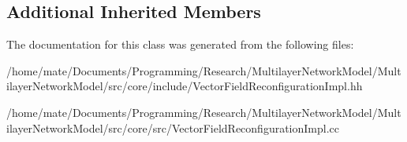 \subsection*{Additional Inherited Members}


The documentation for this class was generated from the following files\+:\begin{DoxyCompactItemize}
\item 
/home/mate/\+Documents/\+Programming/\+Research/\+Multilayer\+Network\+Model/\+Multilayer\+Network\+Model/src/core/include/Vector\+Field\+Reconfiguration\+Impl.\+hh\item 
/home/mate/\+Documents/\+Programming/\+Research/\+Multilayer\+Network\+Model/\+Multilayer\+Network\+Model/src/core/src/Vector\+Field\+Reconfiguration\+Impl.\+cc\end{DoxyCompactItemize}
